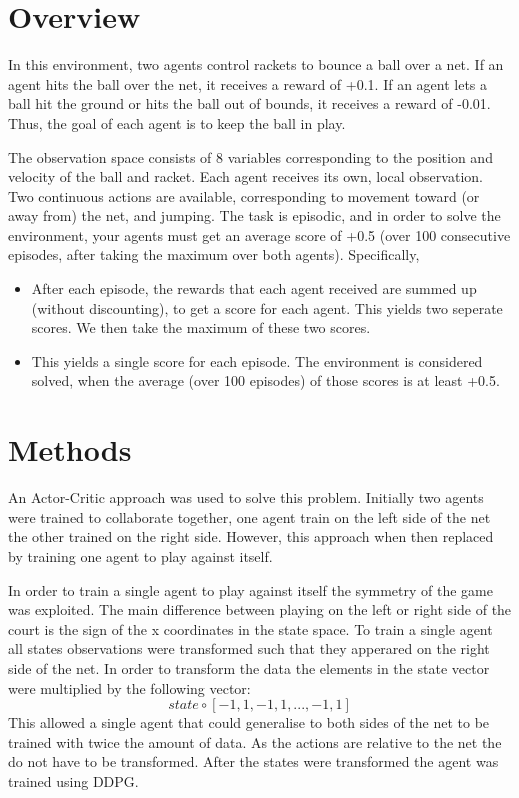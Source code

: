 \documentclass[12pt]{article}
\begin{document}
\maketitle


\section{Overview}

In this environment, two agents control rackets to bounce a ball over a net. 
If an agent hits the ball over the net, it receives a reward of +0.1. 
If an agent lets a ball hit the ground or hits the ball out of bounds, it receives a reward of -0.01. 
Thus, the goal of each agent is to keep the ball in play.

The observation space consists of 8 variables corresponding to the position and velocity of the ball and racket. 
Each agent receives its own, local observation. 
Two continuous actions are available, corresponding to movement toward (or away from) the net, and jumping.
The task is episodic, and in order to solve the environment, your agents must get an average score of +0.5 (over 100 consecutive episodes, after taking the maximum over both agents).
Specifically,
\begin{itemize}
\item After each episode, the rewards that each agent received are summed up (without discounting), to get a score for each agent. 
This yields two seperate scores. 
We then take the maximum of these two scores.
\item This yields a single score for each episode.
The environment is considered solved, when the average (over 100 episodes) of those scores is at least +0.5.
\end{itemize}

\section{Methods}
\label{methods}
An Actor-Critic approach was used to solve this problem.
Initially two agents were trained to collaborate together, one agent train on the left side of the net the other trained on the right side.
However, this approach when then replaced by training one agent to play against itself.

In order to train a single agent to play against itself the symmetry of the game was exploited.
The main difference between playing on the left or right side of the court is the sign of the x coordinates in the state space.
To train a single agent all states observations were transformed such that they apperared on the right side of the net.
In order to transform the data the elements in the state vector were multiplied by the following vector:
\begin{equation}
state \circ [-1,1,-1,1,...,-1,1]
\end{equation}
This allowed a single agent that could generalise to both sides of the net to be trained with twice the amount of data.
As the actions are relative to the net the do not have to be transformed.
After the states were transformed the agent was trained using DDPG.
\end{document}
